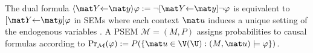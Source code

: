 %
The dual formula
$\langle \mat Y {\gets} \mat y\rangle \varphi := \lnot [\mat Y{\gets }\mat y]\lnot \varphi$
is equivalent 
to $[\mat Y {\gets} \mat y]\varphi$
in SEMs where each context $\mat u$ induces a unique setting of the endogenous variables \cite{halpern-2000}.
A PSEM $\mathcal M = (M, P)$ assigns probabilities to causal formulas according to $\Pr_{\mathcal M}(\varphi) := P(\{ \mat u \in \V(\U) : (M, \mat u) \models \varphi \})$.
% 



